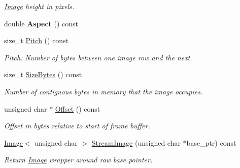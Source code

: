 \begin{DoxyCompactItemize}
\begin{DoxyCompactList}\small\item\em \hyperlink{structpangolin_1_1_image}{Image} height in pixels. \end{DoxyCompactList}\item 
double {\bfseries Aspect} () const \hypertarget{classpangolin_1_1_stream_info_a2974af369680583f4036fdaec9a07bef}{}\label{classpangolin_1_1_stream_info_a2974af369680583f4036fdaec9a07bef}

\item 
size\+\_\+t \hyperlink{classpangolin_1_1_stream_info_ab6614ae5519ee51043855e744bd84357}{Pitch} () const \hypertarget{classpangolin_1_1_stream_info_ab6614ae5519ee51043855e744bd84357}{}\label{classpangolin_1_1_stream_info_ab6614ae5519ee51043855e744bd84357}

\begin{DoxyCompactList}\small\item\em Pitch\+: Number of bytes between one image row and the next. \end{DoxyCompactList}\item 
size\+\_\+t \hyperlink{classpangolin_1_1_stream_info_afd1d4a472fb59a52622d41063c274397}{Size\+Bytes} () const \hypertarget{classpangolin_1_1_stream_info_afd1d4a472fb59a52622d41063c274397}{}\label{classpangolin_1_1_stream_info_afd1d4a472fb59a52622d41063c274397}

\begin{DoxyCompactList}\small\item\em Number of contiguous bytes in memory that the image occupies. \end{DoxyCompactList}\item 
unsigned char $\ast$ \hyperlink{classpangolin_1_1_stream_info_aaf61a6adb5fa2b5848290b324a910048}{Offset} () const \hypertarget{classpangolin_1_1_stream_info_aaf61a6adb5fa2b5848290b324a910048}{}\label{classpangolin_1_1_stream_info_aaf61a6adb5fa2b5848290b324a910048}

\begin{DoxyCompactList}\small\item\em Offset in bytes relative to start of frame buffer. \end{DoxyCompactList}\item 
\hyperlink{structpangolin_1_1_image}{Image}$<$ unsigned char $>$ \hyperlink{classpangolin_1_1_stream_info_a5c4e9224c753125109038e83997dbd70}{Stream\+Image} (unsigned char $\ast$base\+\_\+ptr) const \hypertarget{classpangolin_1_1_stream_info_a5c4e9224c753125109038e83997dbd70}{}\label{classpangolin_1_1_stream_info_a5c4e9224c753125109038e83997dbd70}

\begin{DoxyCompactList}\small\item\em Return \hyperlink{structpangolin_1_1_image}{Image} wrapper around raw base pointer. \end{DoxyCompactList}\end{DoxyCompactItemize}
